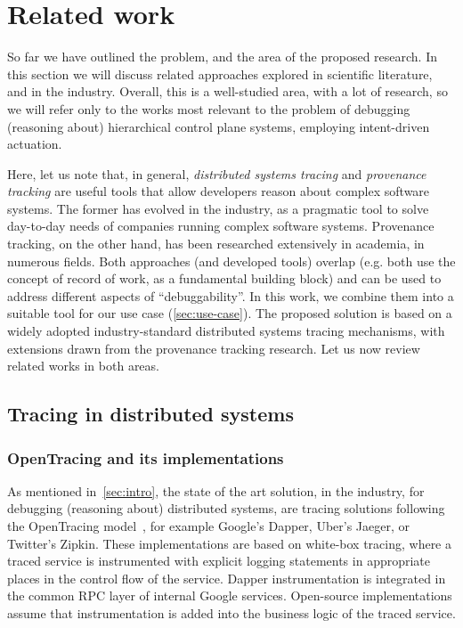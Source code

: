 \newpage
\chapter{Related work}\label{sec:sota}

So far we have outlined the problem, and the area of the proposed research. In this section we will discuss related approaches explored in scientific literature, and in the industry. Overall, this is a well-studied area, with a lot of research, so we will refer only to the works most relevant to the problem of debugging (reasoning about) hierarchical control plane systems, employing intent-driven actuation.

Here, let us note that, in general, \textit{distributed systems tracing} and \textit{provenance tracking} are useful tools that allow developers reason about complex software systems. The former has evolved in the industry, as a pragmatic tool to solve day-to-day needs of companies running complex software systems. Provenance tracking, on the other hand, has been researched extensively in academia, in numerous fields. Both approaches (and developed tools) overlap (e.g. both use the concept of record of work, as a fundamental building block) and can be used to address different aspects of ``debuggability''. In this work, we combine them into a suitable tool for our use case (\cref{sec:use-case}). 
The proposed solution is based on a widely adopted industry-standard distributed systems tracing mechanisms, with extensions drawn from the provenance tracking research. Let us now review related works in both areas.

\section{Tracing in distributed systems}

\subsection{OpenTracing and its implementations} \label{sec:tainting} 

As mentioned in~\cref{sec:intro}, the state of the art solution, in the industry, for debugging (reasoning about) distributed systems, are tracing solutions following the OpenTracing model~\cite{openTracingOnline}, for example Google's Dapper, Uber’s Jaeger, or Twitter’s Zipkin. These implementations are based on white-box tracing, where a traced service is instrumented with explicit logging statements in appropriate places in the control flow of the service. Dapper instrumentation is integrated in the common RPC layer of internal Google services. Open-source implementations assume that instrumentation is added into the business logic of the traced service.

